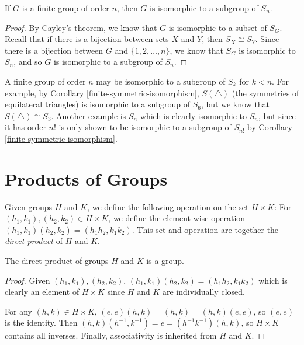 \begin{cor}\label{finite-symmetric-isomorphism}
    If $G$ is a finite group of order $n$, then $G$ is isomorphic to a subgroup of $S_n$.
\end{cor}

\begin{proof}
    By Cayley's theorem, we know that $G$ is isomorphic to a subset of $S_G$. Recall that if there is a bijection between sets $X$ and $Y$, then $S_X \cong S_Y$. Since there is a bijection between $G$ and $\{1, 2, \ldots, n\}$, we know that $S_G$ is isomorphic to $S_n$, and so $G$ is isomorphic to a subgroup of $S_n$.
\end{proof}

\begin{rmk}
    A finite group of order $n$ may be isomorphic to a subgroup of $S_k$ for $k < n$. For example, by Corollary \ref{finite-symmetric-isomorphism}, $S(\triangle)$ (the symmetries of equilateral triangles) is isomorphic to a subgroup of $S_6$, but we know that $S(\triangle) \cong S_3$. Another example is $S_n$ which is clearly isomorphic to $S_n$, but since it has order $n!$ is only shown to be isomorphic to a subgroup of $S_{n!}$ by Corollary \ref{finite-symmetric-isomorphism}.
\end{rmk}

\section{Products of Groups}

\begin{defn}
    Given groups $H$ and $K$, we define the following operation on the set $H \times K$: For $(h_1, k_1), (h_2, k_2) \in H \times K$, we define the element-wise operation $(h_1, k_1)(h_2, k_2) = (h_1h_2, k_1k_2)$. This set and operation are together the \emph{direct product} of $H$ and $K$.
\end{defn}

\begin{prop}
    The direct product of groups $H$ and $K$ is a group.
\end{prop}

\begin{proof}
    Given $(h_1, k_1), (h_2, k_2)$, $(h_1, k_1)(h_2, k_2) = (h_1h_2, k_1k_2)$ which is clearly an element of $H \times K$ since $H$ and $K$ are individually closed.

    For any $(h, k) \in H \times K$, $(e, e)(h,k) = (h, k) = (h, k)(e, e)$, so $(e, e)$ is the identity. Then $(h, k)(h^{-1}, k^{-1}) = e = (h^{-1}k^{-1})(h, k)$, so $H \times K$ contains all inverses. Finally, associativity is inherited from $H$ and $K$.
\end{proof}

